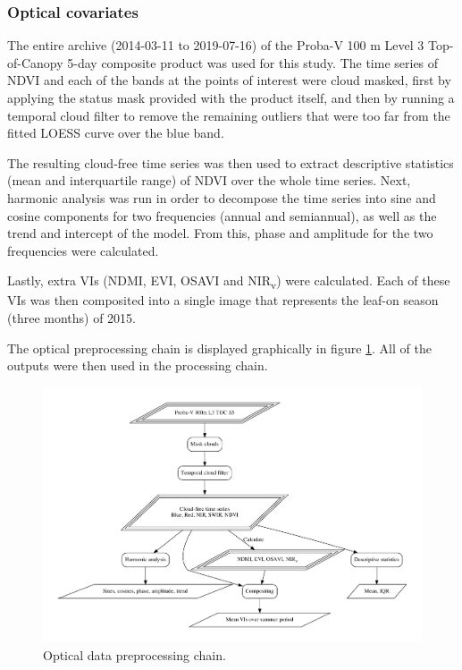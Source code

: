 \documentclass[a4paper,10pt]{article}
\begin{document}
\subsubsection{Optical covariates}

The entire archive (2014-03-11 to 2019-07-16) of the Proba-V 100 m Level 3 Top-of-Canopy 5-day composite product \citep{probavguide2} was used for this study.
The time series of NDVI and each of the bands at the points of interest were cloud masked, first by applying the status mask provided with the product itself, and then by running a temporal cloud filter to remove the remaining outliers that were too far from the fitted \ac{LOESS} curve over the blue band.

The resulting cloud-free time series was then used to extract descriptive statistics (mean and interquartile range) of NDVI over the whole time series.
Next, harmonic analysis was run in order to decompose the time series into sine and cosine components for two frequencies (annual and semiannual), as well as the trend and intercept of the model.
From this, phase and amplitude for the two frequencies were calculated.

Lastly, extra \glspl{VI} (NDMI, EVI, OSAVI and NIR\textsubscript{v}) were calculated.
Each of these \glspl{VI} was then composited into a single image that represents the leaf-on season (three months) of 2015.

The optical preprocessing chain is displayed graphically in figure \ref{fig-preprocessing-optical}.
All of the outputs were then used in the processing chain.

\begin{figure}
 \includegraphics[width=\textwidth]{article-figures/flowcharts/preprocessing-optical}
 \caption{Optical data preprocessing chain.}
 \label{fig-preprocessing-optical}
\end{figure}
\end{document}
